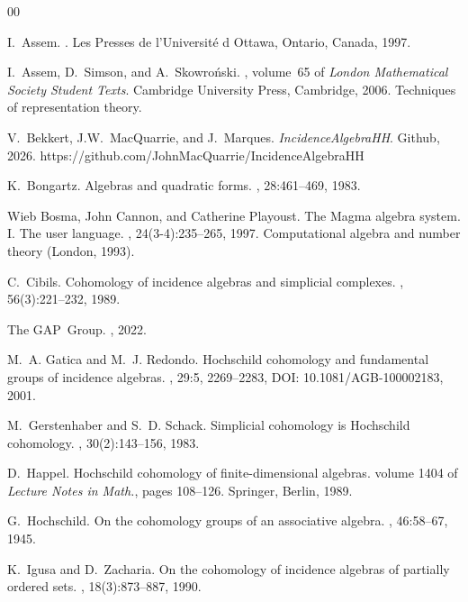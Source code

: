 \documentclass[preprint,review,12pt]{elsarticle}
\begin{document}
\begin{thebibliography}{00}

I.~Assem.
.
\newblock Les Presses de l'Université d Ottawa, Ontario, Canada, 1997.

I.~Assem, D.~Simson, and A.~Skowro\'{n}ski.
, volume~65 of {\em London Mathematical Society Student Texts}.
\newblock Cambridge University Press, Cambridge, 2006.
\newblock Techniques of representation theory.


V.~Bekkert, J.W.~MacQuarrie, and J.~Marques. {\em IncidenceAlgebraHH}.
\newblock Github, 2026.
\newblock https://github.com/JohnMacQuarrie/IncidenceAlgebraHH


K.~Bongartz.
\newblock Algebras and quadratic forms.
, 28:461--469, 1983.

Wieb Bosma, John Cannon, and Catherine Playoust.
\newblock The {M}agma algebra system. {I}. {T}he user language.
, 24(3-4):235--265, 1997.
\newblock Computational algebra and number theory (London, 1993).

C.~Cibils.
\newblock Cohomology of incidence algebras and simplicial complexes.
, 56(3):221--232, 1989.

The GAP~Group.
,
  2022.

M.~A. Gatica and M.~J. Redondo.
\newblock Hochschild cohomology and fundamental groups of incidence algebras.
, 29:5, 2269--2283, DOI: 10.1081/AGB-100002183, 2001.

M.~Gerstenhaber and S.~D. Schack.
\newblock Simplicial cohomology is {H}ochschild cohomology.
, 30(2):143--156, 1983.

D.~Happel.
\newblock Hochschild cohomology of finite-dimensional algebras.
\newblock volume 1404 of {\em Lecture Notes in Math.}, pages 108--126.
  Springer, Berlin, 1989.

G.~Hochschild.
\newblock On the cohomology groups of an associative algebra.
, 46:58--67, 1945.

K.~Igusa and D.~Zacharia.
\newblock On the cohomology of incidence algebras of partially ordered sets.
, 18(3):873--887, 1990.



\end{thebibliography}
\end{document}
